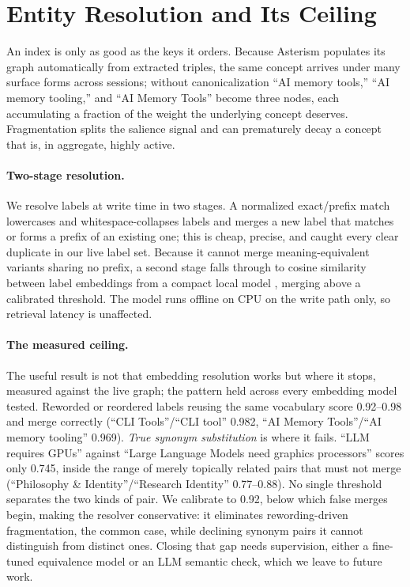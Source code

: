 \documentclass[11pt]{article}
\begin{document}
\section{Entity Resolution and Its Ceiling}
\label{sec:er}

An index is only as good as the keys it orders. Because Asterism populates its graph automatically from extracted triples, the same concept arrives under many surface forms across sessions; without canonicalization ``AI memory tools,'' ``AI memory tooling,'' and ``AI Memory Tools'' become three nodes, each accumulating a fraction of the weight the underlying concept deserves. Fragmentation splits the salience signal and can prematurely decay a concept that is, in aggregate, highly active.

\paragraph{Two-stage resolution.} We resolve labels at write time in two stages. A normalized exact/prefix match lowercases and whitespace-collapses labels and merges a new label that matches or forms a prefix of an existing one; this is cheap, precise, and caught every clear duplicate in our live label set. Because it cannot merge meaning-equivalent variants sharing no prefix, a second stage falls through to cosine similarity between label embeddings from a compact local model \citep{xiao2023cpack}, merging above a calibrated threshold. The model runs offline on CPU on the write path only, so retrieval latency is unaffected.

\paragraph{The measured ceiling.} The useful result is not that embedding resolution works but where it stops, measured against the live graph; the pattern held across every embedding model tested. Reworded or reordered labels reusing the same vocabulary score 0.92--0.98 and merge correctly (``CLI Tools''/``CLI tool'' 0.982, ``AI Memory Tools''/``AI memory tooling'' 0.969). \emph{True synonym substitution} is where it fails. ``LLM requires GPUs'' against ``Large Language Models need graphics processors'' scores only 0.745, inside the range of merely topically related pairs that must not merge (``Philosophy \& Identity''/``Research Identity'' 0.77--0.88). No single threshold separates the two kinds of pair. We calibrate to 0.92, below which false merges begin, making the resolver conservative: it eliminates rewording-driven fragmentation, the common case, while declining synonym pairs it cannot distinguish from distinct ones. Closing that gap needs supervision, either a fine-tuned equivalence model or an LLM semantic check, which we leave to future work.
\end{document}
